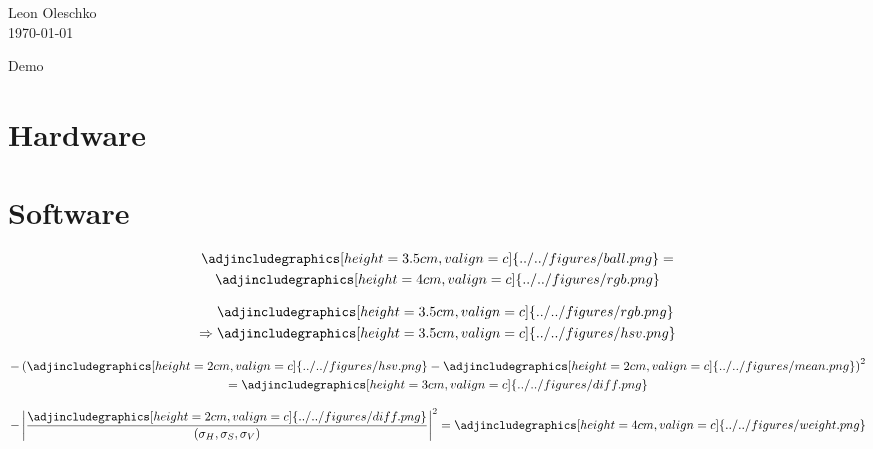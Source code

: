 \documentclass[aspectratio=169, 20pt]{beamer}
\author{Leon Oleschko}
\date{\today}
\begin{document}
\begin{frame}
	\large
	
	\vfill
	\normalsize
	Leon Oleschko\\
	\today
	
	\vfill
\end{frame}

\begin{frame}{Demo}
\end{frame}

\section{Hardware}

\section{Software}
\begin{frame}
	\begin{gather*}
		\adjincludegraphics[height=3.5cm, valign=c]{../../figures/ball.png}
		= \\
		\adjincludegraphics[height=4cm, valign=c]{../../figures/rgb.png}
	\end{gather*}
\end{frame}

\begin{frame}
	\begin{align*}
		&\adjincludegraphics[height=3.5cm, valign=c]{../../figures/rgb.png}\\
		\Rightarrow\; &\adjincludegraphics[height=3.5cm, valign=c]{../../figures/hsv.png}
	\end{align*}
\end{frame}

\begin{frame}
	\begin{gather*}
		- \left(
				\adjincludegraphics[height=2cm, valign=c]{../../figures/hsv.png} - \adjincludegraphics[height=2cm, valign=c]{../../figures/mean.png}
		\right)^2\\
	= \adjincludegraphics[height=3cm, valign=c]{../../figures/diff.png}
	\end{gather*}
\end{frame}

\begin{frame}
	\begin{gather*}
		- \left|
			\frac{
				\adjincludegraphics[height=2cm, valign=c]{../../figures/diff.png}
			}{(\sigma_H, \sigma_S, \sigma_V)}
		\right|^2
	= \adjincludegraphics[height=4cm, valign=c]{../../figures/weight.png}
	\end{gather*}
\end{frame}


\begin{frame}
\end{frame}
\end{document}
